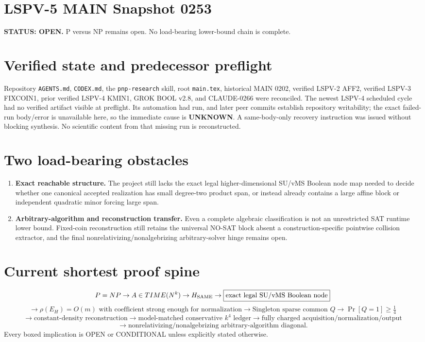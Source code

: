 \documentclass[11pt]{article}
\begin{document}
\section*{LSPV-5 MAIN Snapshot 0253}
\textbf{STATUS: OPEN.} P versus NP remains open. No load-bearing lower-bound chain is complete.

\section*{Verified state and predecessor preflight}
Repository \texttt{AGENTS.md}, \texttt{CODEX.md}, the \texttt{pnp-research} skill, root \texttt{main.tex}, historical MAIN 0202, verified LSPV-2 AFF2, verified LSPV-3 FIXCOIN1, prior verified LSPV-4 KMIN1, GROK BOOL v2.8, and CLAUDE-0266 were reconciled. The newest LSPV-4 scheduled cycle had no verified artifact visible at preflight. Its automation had run, and later peer commits establish repository writability; the exact failed-run body/error is unavailable here, so the immediate cause is \textbf{UNKNOWN}. A same-body-only recovery instruction was issued without blocking synthesis. No scientific content from that missing run is reconstructed.

\section*{Two load-bearing obstacles}
\begin{enumerate}
\item \textbf{Exact reachable structure.} The project still lacks the exact legal higher-dimensional SU/vMS Boolean node map needed to decide whether one canonical accepted realization has small degree-two product span, or instead already contains a large affine block or independent quadratic minor forcing large span.
\item \textbf{Arbitrary-algorithm and reconstruction transfer.} Even a complete algebraic classification is not an unrestricted SAT runtime lower bound. Fixed-coin reconstruction still retains the universal NO-SAT block absent a construction-specific pointwise collision extractor, and the final nonrelativizing/nonalgebrizing arbitrary-solver hinge remains open.
\end{enumerate}

\section*{Current shortest proof spine}
\[
P=NP\to A\in TIME(N^k)\to H_{\rm SAME}
\to \boxed{\text{exact legal SU/vMS Boolean node}}
\]
\[
\to \boxed{\rho(E_H)=O(m)\text{ with coefficient strong enough for normalization}}
\to \text{Singleton sparse common }Q
\to \Pr[Q=1]\ge\tfrac14
\]
\[
\to \text{constant-density reconstruction}
\to \boxed{\text{model-matched conservative }k^4\text{ ledger}}
\to \boxed{\text{fully charged acquisition/normalization/output}}
\]
\[
\to \boxed{\text{nonrelativizing/nonalgebrizing arbitrary-algorithm diagonal}}.
\]
Every boxed implication is OPEN or CONDITIONAL unless explicitly stated otherwise.
\end{document}

